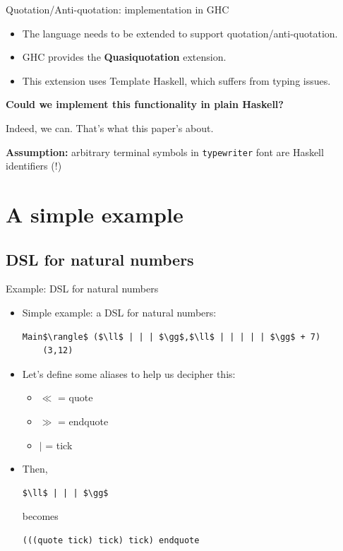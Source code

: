 \documentclass[10pt]{beamer}
\begin{document}
\begin{frame}[fragile]{Quotation/Anti-quotation: implementation in GHC}

\begin{itemize}
\item The language needs to be extended to support quotation/anti-quotation.
\item GHC provides the \textbf{Quasiquotation} extension.
\item This extension uses Template Haskell, which suffers from typing issues.
\end{itemize}

\begin{center}
\textbf{Could we implement this functionality in plain Haskell?}

Indeed, we can. That's what this paper's about.
\end{center}
\begin{center}
\textbf{Assumption:} arbitrary terminal symbols in \texttt{typewriter} font are Haskell identifiers (!)
\end{center}

\end{frame}

\section{A simple example}
\subsection{DSL for natural numbers}
\begin{frame}[fragile]{Example: DSL for natural numbers}

\begin{itemize}
\item Simple example: a DSL for natural numbers:

\begin{lstlisting}[mathescape=true]
	Main$\rangle$ ($\ll$ | | | $\gg$,$\ll$ | | | | | $\gg$ + 7)
	(3,12)
\end{lstlisting}

\item Let's define some aliases to help us decipher this:
\begin{itemize}
	\item $\ll$ = quote
	\item $\gg$ = endquote
	\item $|$ = tick
\end{itemize}

\item Then,

\begin{lstlisting}[mathescape=true]
	$\ll$ | | | $\gg$
\end{lstlisting}

becomes

\begin{lstlisting}[mathescape=true]
	(((quote tick) tick) tick) endquote
\end{lstlisting}

\end{itemize}

\end{frame}
\end{document}
